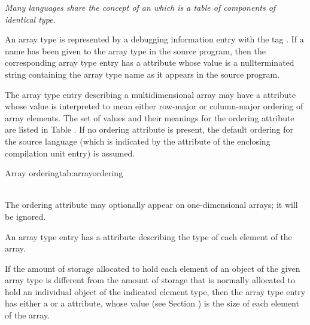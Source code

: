 \textit{Many languages share the concept of an  which is
a table of components of identical type.}

An array type is represented by a debugging information entry
with the tag \DWTAGarraytypeTARG. 
If a name has been given to
the array type in the source program, then the corresponding
array type entry has a \DWATname{} attribute 
whose value is a
null\dash terminated string containing the array type name as it
appears in the source program.

The 
\hypertarget{chap:DWATorderingarrayrowcolumnordering}{}
array type entry describing a multidimensional array may
have a \DWATorderingDEFN{} attribute whose 
 value is
interpreted to mean either row-major or column-major ordering
of array elements. The set of values and their meanings
for the ordering attribute are listed in 
Table . 
If no
ordering attribute is present, the default ordering for the
source language (which is indicated by the 
\DWATlanguage{}
attribute 
of the enclosing compilation unit entry) is assumed.

\begin{simplenametable}[1.8in]{Array ordering}{tab:arrayordering}
\DWORDcolmajorTARG{} \\
\DWORDrowmajorTARG{} \\
\end{simplenametable}

The ordering attribute may optionally appear on one-dimensional
arrays; it will be ignored.

An array type entry has 
a \DWATtype{} attribute
describing
the type of each element of the array.

If the amount of storage allocated to hold each element of an
object of the given array type is different from the amount
of storage that is normally allocated to hold an individual
\hypertarget{chap:DWATbitstridearrayelementstrideofarraytype}{}
object of the 
\hypertarget{chap:DWATbytestridearrayelementstrideofarraytype}{}
indicated element type, then the array type
entry has either a 
\DWATbytestrideDEFN{} 
or 
a \DWATbitstrideDEFN{}
attribute, 
whose value 
(see Section ) 
is the size of each
element of the array.

